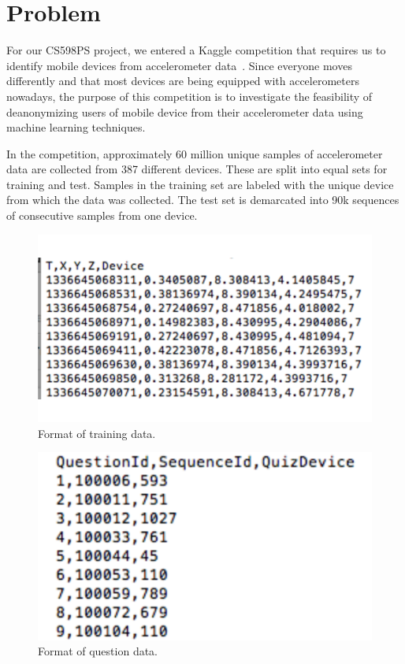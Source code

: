 \section{Problem}

For our CS598PS project, we entered a Kaggle competition that requires us to
identify mobile devices from accelerometer data~\cite{Kaggle2013}. Since
everyone moves differently and that most devices are being equipped with
accelerometers nowadays, the purpose of this competition is to investigate the
feasibility of deanonymizing users of mobile device from their accelerometer
data using machine learning techniques.

In the competition, approximately 60 million unique samples of accelerometer
data are collected from 387 different devices. These are split into equal sets
for training and test. Samples in the training set are labeled with the unique
device from which the data was collected. The test set is demarcated into 90k
sequences of consecutive samples from one device.

\begin{figure}
  \centering
  \includegraphics[width=\linewidth]{./figs/train_data.png}
  \caption{Format of training data.}
  \label{fig:train}
\end{figure}

\begin{figure}
  \centering
  \includegraphics[width=\linewidth]{./figs/questions.png}
  \caption{Format of question data.}
  \label{fig:question}
\end{figure}

